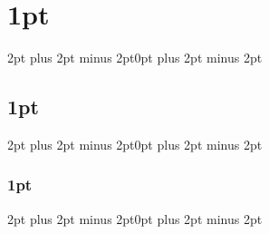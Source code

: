 \documentclass[twoside, openany, phd]{IUST-Thesis} %
\begin{document}
\titlespacing\section{1pt}{2pt plus 2pt minus 2pt}{0pt plus 2pt minus 2pt}
\titlespacing\subsection{1pt}{2pt plus 2pt minus 2pt}{0pt plus 2pt minus 2pt}
\titlespacing\subsubsection{1pt}{2pt plus 2pt minus 2pt}{0pt plus 2pt minus 2pt}
\setlength{\textfloatsep}{10pt}
%
\setlength{\abovedisplayskip}{1pt}
\setlength{\belowdisplayskip}{1pt}


%

\hypertarget{tableofcontent}{\tableofcontents}\label{tableofcontent2} %
\clearpage

\listoffigures 
\clearpage

\listoftables
\clearpage


\printacronyms
\clearpage

\pagestyle{fancy}

\clearpage
\fancyhead[LO,RE]{\slshape }
\onehalfspacing



\clearpage
\appendix %
\fancyhead[LO,RE]{\slshape \leftmark}
%
%
\clearpage

\fancyhead[LO, RE]{\slshape}
\onehalfspacing
\printglossary %
\clearpage
{}
\end{document}
